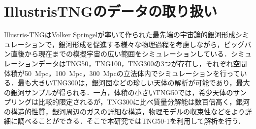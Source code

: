 \section{IllustrisTNGのデータの取り扱い}
%
%
%
%
%
%
%

Illustris-TNGはVolker Springelが率いて作られた最先端の宇宙論的銀河形成シミュレーションで，銀河形成を促進する様々な物理過程を考慮しながら，ビッグバン直後から現在までの模擬宇宙の広い範囲をシミュレーションしている．シミュレーションデータはTNG50，TNG100，TNG300の3つが存在し，それぞれ空間体積が\SI{50}{Mpc}，\SI{100}{Mpc}，\SI{300}{Mpc}の立法体内でシミュレーションを行っている．最も大きいTNG300は，銀河団などの珍しい天体の解析が可能であり，最大の銀河サンプルが得られる．一方，体積の小さいTNG50では，希少天体のサンプリングは比較的限定されるが，TNG300に比べ質量分解能は数百倍高く，銀河の構造的性質，銀河周辺のガスの詳細な構造，物理モデルの収束性などをより詳細に調べることができる．そこで本研究ではTNG50-1を利用して解析を行う．

